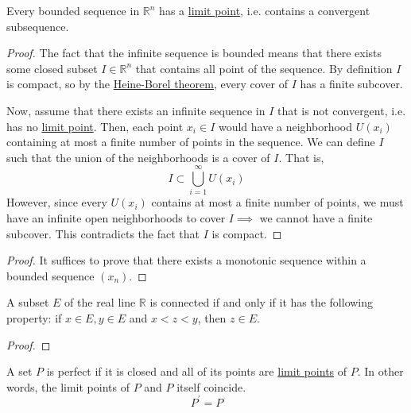   \begin{corollary}
    \label{thm:bolzano-weierstrass-theorem}
    Every bounded sequence in $\mathbb{R}^n$ has a \hyperref[pst-def:limit-point]{limit point}, i.e. contains a convergent subsequence. 
  \end{corollary}
  \begin{proof}
    The fact that the infinite sequence is bounded means that there exists some closed subset $I \in \mathbb{R}^n$ that contains all point of the sequence. By definition $I$ is compact, so by the \hyperref[pst-thm:heine-borel-theorem]{Heine-Borel theorem}, every cover of $I$ has a finite subcover. 

    Now, assume that there exists an infinite sequence in $I$ that is not convergent, i.e. has no \hyperref[pst-def:limit-point]{limit point}. Then, each point $x_i \in I$ would have a neighborhood $U(x_i)$ containing at most a finite number of points in the sequence. We can define $I$ such that the union of the neighborhoods is a cover of $I$. That is, 
    \begin{equation}
      I \subset \bigcup_{i=1}^\infty U(x_i)
    \end{equation}
    However, since every $U(x_i)$ contains at most a finite number of points, we must have an infinite open neighborhoods to cover $I \implies$ we cannot have a finite subcover. This contradicts the fact that $I$ is compact. 
  \end{proof}
  \begin{proof}
    It suffices to prove that there exists a monotonic sequence within a bounded sequence $(x_n)$. 
  \end{proof}

  \begin{theorem}[Connectedness]
    \label{thm:connectedness-2}
    A subset $E$ of the real line $\mathbb{R}$ is connected if and only if it has the following property: if $x \in E, y \in E$ and $x < z < y$, then $z \in E$. 
  \end{theorem}
  \begin{proof}

  \end{proof}

  \begin{definition}
    \label{def:perfect-sets}
    A set $P$ is perfect if it is closed and all of its points are \hyperref[pst-def:limit-point]{limit points} of $P$. In other words, the limit points of $P$ and $P$ itself coincide. 
    \begin{equation}
      P^\prime = P
    \end{equation}
  \end{definition}

